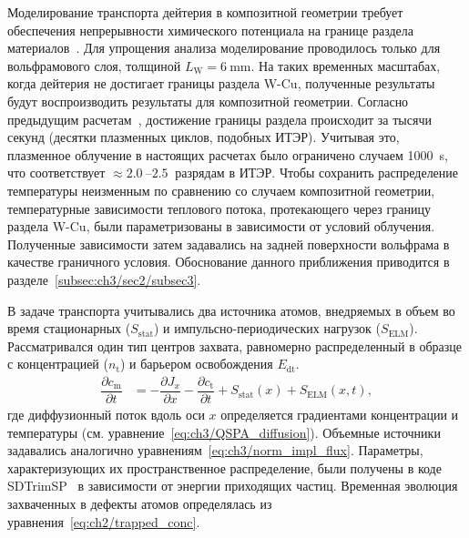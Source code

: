 Моделирование транспорта дейтерия в композитной геометрии требует обеспечения непрерывности химического потенциала на границе раздела материалов~\cite{Delaporte-Mathurin2021_3}. Для упрощения анализа моделирование проводилось только для вольфрамового слоя, толщиной \( L_\mathrm{W}=\SI{6}{\milli\meter} \). На таких временных масштабах, когда дейтерия не достигает границы раздела W-Cu, полученные результаты будут воспроизводить результаты для композитной геометрии. Согласно предыдущим расчетам~\cite{Delaporte-Mathurin2019, Delaporte-Mathurin2021_3}, достижение границы раздела происходит за тысячи секунд (десятки плазменных циклов, подобных ИТЭР). Учитывая это, плазменное облучение в настоящих расчетах было ограничено случаем \SI{1000}{\second}, что соответствует \( \approx \SIrange{2.0}{2.5}{} \) разрядам в ИТЭР. Чтобы сохранить распределение температуры неизменным по сравнению со случаем композитной геометрии, температурные зависимости теплового потока, протекающего через границу раздела W-Cu, были параметризованы в зависимости от условий облучения. Полученные зависимости затем задавались на задней поверхности вольфрама в качестве граничного условия. Обоснование данного приближения приводится в разделе~\cref{subsec:ch3/sec2/subsec3}.

В задаче транспорта учитывались два источника атомов, внедряемых в объем во время стационарных (\( S_\mathrm{stat} \)) и импульсно-периодических нагрузок (\( S_\mathrm{ELM} \)). Рассматривался один тип центров захвата, равномерно распределенный в образце с концентрацией (\( n_\mathrm{t} \)) и барьером освобождения \(E_\mathrm{dt} \).
\begin{subequations}
	\label{eq:ch3/diffusion_equation_ITER}
	\begin{align}
		\dfrac{\partial c_{\mathrm{m}}}{\partial t} & =-\dfrac{\partial J_x}{\partial x} - \dfrac{\partial c_{\mathrm{t}}}{\partial t} + S_{\mathrm{stat}}(x)+S_{\mathrm{ELM}}(x,t),
	\end{align}
\end{subequations}
где диффузионный поток вдоль оси \( x \) определяется градиентами концентрации и температуры (см. уравнение~\cref{eq:ch3/QSPA_diffusion}). Объемные источники задавались аналогично уравнениям~\cref{eq:ch3/norm_impl_flux}. Параметры, характеризующих их пространственное распределение, были получены в коде SDTrimSP~\cite{mutzke2024sdtrimsp} в зависимости от энергии приходящих частиц. Временная эволюция захваченных в дефекты атомов определялась из уравнения~\cref{eq:ch2/trapped_conc}. 

